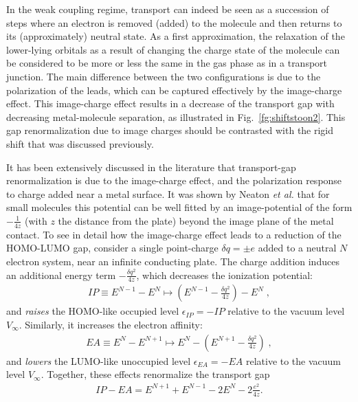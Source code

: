 \documentclass[aip,jcp,a4paper,reprint,floatfix,superscriptaddress]{revtex4-1}
\newcommand{\etal}{\emph{et al.}\xspace}
\begin{document}
In the weak coupling regime, transport can indeed be seen as a succession of steps where an electron is removed (added) to the molecule and then returns to its (approximately) neutral state. As a first approximation, the relaxation of the lower-lying orbitals as a result of changing the charge state of the molecule can be considered to be more or less the same in the gas phase as in a transport junction. The main difference between the two configurations is due to the polarization of the leads, which can be captured effectively by the image-charge effect. This image-charge effect results in a decrease of the transport gap  with decreasing metal-molecule separation, as illustrated in Fig.~\ref{fg:shiftstoon2}. This gap renormalization due to image charges should be contrasted with the rigid shift that was discussed previously. 

It has been extensively discussed in the literature that transport-gap renormalization is due to the image-charge effect,\cite{Quek2007,Neaton2006,Hybertsen1986,Hybertsen2008,Thygesen2009} and the 
polarization response to charge added near a metal surface. It was shown by Neaton \etal\cite{Neaton2006} that for small molecules this potential can be well fitted by an image-potential of the form $-\frac{1}{4z}$ (with $z$ the distance from the plate) beyond the image plane of the metal contact. 
To see in detail how the image-charge effect leads to a reduction of the HOMO-LUMO gap, consider a single point-charge $\delta q=\pm e$ added to a neutral $N$ electron system, near an infinite conducting plate. The charge addition induces an additional energy term $-\frac{\delta q^2}{4z}$, which decreases the ionization potential:
\begin{align}
   \label{eq:HOMO}
   IP\equiv E^{N-1}-E^N \mapsto (E^{N-1}- \frac{\delta q^2}{4z}) - E^N\;,
\end{align}
and \emph{raises} the HOMO-like occupied level $\epsilon_{IP}=-IP$ relative to the vacuum level $V_\infty$. Similarly, it increases the electron affinity:
\begin{align}
   \label{eq:LUMO}
   EA \equiv E^{N}-E^{N+1} \mapsto E^{N} -(E^{N+1}- \frac{\delta q^2}{4z})\;,
\end{align}
and \emph{lowers} the LUMO-like unoccupied level $\epsilon_{EA}=-EA$ relative to the vacuum level $V_\infty$. Together, these effects renormalize the transport gap 
\begin{align}
   \label{eq:GAP-RENORMA}
IP-EA = E^{N+1} + E^{N-1} - 2E^{N} -2\frac{e^2}{4z}.
\end{align}
\end{document}
